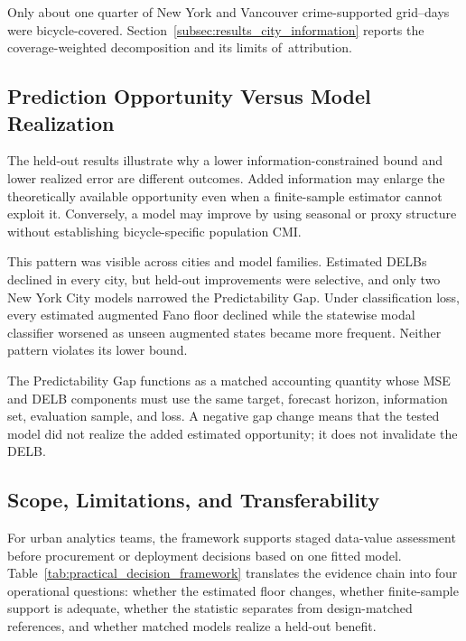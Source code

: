 \documentclass[applsci,article,accept,moreauthors]{Definitions/mdpi}
\begin{document}
{Only about one quarter of New York and Vancouver crime-supported
grid--days were bicycle-covered. Section~\ref{subsec:results_city_information}
reports the coverage-weighted decomposition and its limits of~attribution.}

\subsection{Prediction Opportunity Versus Model Realization}
\label{subsec:discussion_prediction}

The held-out results illustrate why a lower information-constrained bound and
lower realized error are different outcomes. Added information may enlarge
the theoretically available opportunity even when a finite-sample estimator
cannot exploit it. Conversely, a model may improve by using seasonal or proxy
structure without establishing bicycle-specific population CMI.

This pattern was visible across cities and model families. Estimated
DELBs declined in every city, but held-out improvements were selective, and
only two New York City models narrowed the Predictability Gap. Under
classification loss, every estimated augmented Fano floor declined while the
statewise modal classifier worsened as unseen augmented states became more
frequent. Neither pattern violates its lower bound.

The Predictability Gap functions as a matched accounting quantity whose MSE
and DELB components must use the
same target, forecast horizon, information set, evaluation sample, and loss.
A negative gap change means that the tested model did not realize the added
estimated opportunity; it does not invalidate the DELB.


\subsection{Scope, Limitations, and Transferability}
\label{subsec:limitations}

For urban analytics teams, the framework supports staged data-value
assessment before procurement or deployment decisions based on one fitted model.
Table~\ref{tab:practical_decision_framework} translates the evidence chain
into four operational questions: whether the estimated floor changes,
whether finite-sample support is adequate, whether the statistic separates
from design-matched references, and whether matched models realize a held-out
benefit.
\end{document}
